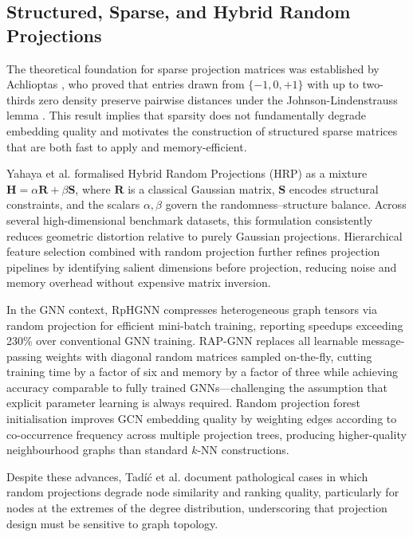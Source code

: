 \documentclass[conference]{IEEEtran}
\begin{document}
\subsection{Structured, Sparse, and Hybrid Random Projections}

The theoretical foundation for sparse projection matrices was established
by Achlioptas \cite{achlioptas2003}, who proved that entries drawn from
$\{-1, 0, +1\}$ with up to two-thirds zero density preserve pairwise
distances under the Johnson-Lindenstrauss lemma \cite{johnson1984}.
This result implies that sparsity does not fundamentally degrade embedding
quality and motivates the construction of structured sparse matrices that
are both fast to apply and memory-efficient.

Yahaya et al. \cite{yahaya2025hrp} formalised Hybrid Random Projections
(HRP) as a mixture $\mathbf{H} = \alpha\mathbf{R} + \beta\mathbf{S}$,
where $\mathbf{R}$ is a classical Gaussian matrix, $\mathbf{S}$ encodes
structural constraints, and the scalars $\alpha, \beta$ govern the
randomness--structure balance. Across several high-dimensional benchmark
datasets, this formulation consistently reduces geometric distortion relative
to purely Gaussian projections. Hierarchical feature selection combined
with random projection \cite{wang2019hierarchical} further refines
projection pipelines by identifying salient dimensions before projection,
reducing noise and memory overhead without expensive matrix inversion.

In the GNN context, RpHGNN \cite{hu2021rphgnn} compresses heterogeneous
graph tensors via random projection for efficient mini-batch training,
reporting speedups exceeding 230\% over conventional GNN training.
RAP-GNN \cite{bui2023rap} replaces all learnable message-passing weights
with diagonal random matrices sampled on-the-fly, cutting training time by
a factor of six and memory by a factor of three while achieving accuracy
comparable to fully trained GNNs---challenging the assumption that explicit
parameter learning is always required. Random projection forest
initialisation \cite{alshammari2020rpforest} improves GCN embedding quality
by weighting edges according to co-occurrence frequency across multiple
projection trees, producing higher-quality neighbourhood graphs than
standard $k$-NN constructions.

Despite these advances, Tad\'{i}\'{c} et al. \cite{tadic2024} document
pathological cases in which random projections degrade node similarity
and ranking quality, particularly for nodes at the extremes of the degree
distribution, underscoring that projection design must be sensitive to
graph topology.
\end{document}
